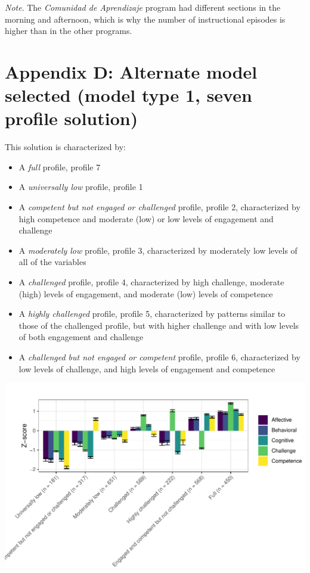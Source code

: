 \documentclass[]{msu-thesis}
\providecommand{\tightlist}{%
  \setlength{\itemsep}{0pt}\setlength{\parskip}{0pt}}
\theoremstyle{definition}
\theoremstyle{definition}
\theoremstyle{definition}
\theoremstyle{remark}
\begin{document}
\emph{Note}. The \emph{Comunidad de Aprendizaje} program had different
sections in the morning and afternoon, which is why the number of
instructional episodes is higher than in the other programs.

\section{Appendix D: Alternate model selected (model type 1, seven
profile
solution)}\label{appendix-d-alternate-model-selected-model-type-1-seven-profile-solution}

This solution is characterized by:

\begin{itemize}
\tightlist
\item
  A \emph{full} profile, profile 7
\item
  A \emph{universally low} profile, profile 1
\item
  A \emph{competent but not engaged or challenged} profile, profile 2,
  characterized by high competence and moderate (low) or low levels of
  engagement and challenge
\item
  A \emph{moderately low} profile, profile 3, characterized by
  moderately low levels of all of the variables
\item
  A \emph{challenged} profile, profile 4, characterized by high
  challenge, moderate (high) levels of engagement, and moderate (low)
  levels of competence
\item
  A \emph{highly challenged} profile, profile 5, characterized by
  patterns similar to those of the challenged profile, but with higher
  challenge and with low levels of both engagement and challenge
\item
  A \emph{challenged but not engaged or competent} profile, profile 6,
  characterized by low levels of challenge, and high levels of
  engagement and competence
\end{itemize}

\begin{center}\includegraphics[width=0.9\linewidth]{rosenberg-dissertation_files/figure-latex/m1_7p-1} \end{center}
\end{document}
